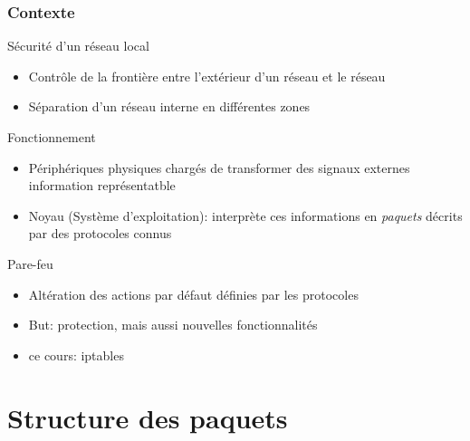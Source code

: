 


  
\usepackage{ifthen}


\def\txthl#1{ \ifthenelse{\lengthtest{#1 pt<0.5pt}}{\top}{\bot} }



\begin{reveals}
		
\maketitle

\begin{frame}
  \frametitle{Contexte}
  \vfill
  \begin{block}{Sécurité d'un réseau local}
    \begin{itemize}
    \item Contrôle de la frontière entre l'extérieur d'un réseau et le réseau
    \item Séparation d'un réseau interne en différentes zones
    \end{itemize}
  \end{block}
  \vfill
  \begin{block}{Fonctionnement}
    \begin{itemize}
    \item Périphériques physiques chargés de transformer des signaux
      externes information représentatble 
    \item Noyau (Système d'exploitation): interprète ces informations
      en \emph{paquets} décrits par des protocoles connus 
    \end{itemize}
  \end{block}
  \vfill
  \begin{block}{Pare-feu}
    \begin{itemize}
    \item Altération des actions par défaut définies par les
      protocoles
    \item But: protection, mais aussi nouvelles fonctionnalités
    \item ce cours: iptables
    \end{itemize}
  \end{block}
  \vfill
\end{frame}


\section{Structure des paquets}


\end{reveals}
